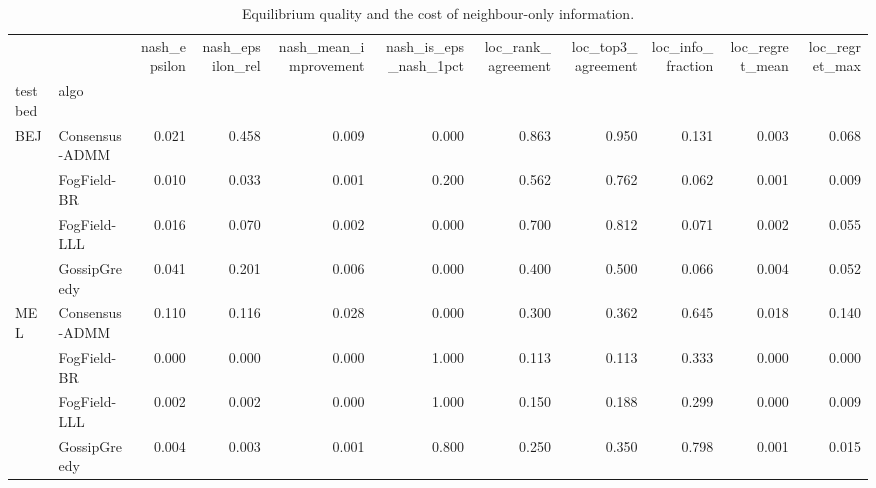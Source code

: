 \begin{table}
\caption{Equilibrium quality and the cost of neighbour-only information.}
\label{tab:table5_equilibrium}
\begin{tabular}{llrrrrrrrrr}
\toprule
 &  & nash\_epsilon & nash\_epsilon\_rel & nash\_mean\_improvement & nash\_is\_eps\_nash\_1pct & loc\_rank\_agreement & loc\_top3\_agreement & loc\_info\_fraction & loc\_regret\_mean & loc\_regret\_max \\
testbed & algo &  &  &  &  &  &  &  &  &  \\
\midrule
\multirow[t]{4}{*}{BEJ} & Consensus-ADMM & 0.021 & 0.458 & 0.009 & 0.000 & 0.863 & 0.950 & 0.131 & 0.003 & 0.068 \\
 & FogField-BR & 0.010 & 0.033 & 0.001 & 0.200 & 0.562 & 0.762 & 0.062 & 0.001 & 0.009 \\
 & FogField-LLL & 0.016 & 0.070 & 0.002 & 0.000 & 0.700 & 0.812 & 0.071 & 0.002 & 0.055 \\
 & GossipGreedy & 0.041 & 0.201 & 0.006 & 0.000 & 0.400 & 0.500 & 0.066 & 0.004 & 0.052 \\
\cline{1-11}
\multirow[t]{4}{*}{MEL} & Consensus-ADMM & 0.110 & 0.116 & 0.028 & 0.000 & 0.300 & 0.362 & 0.645 & 0.018 & 0.140 \\
 & FogField-BR & 0.000 & 0.000 & 0.000 & 1.000 & 0.113 & 0.113 & 0.333 & 0.000 & 0.000 \\
 & FogField-LLL & 0.002 & 0.002 & 0.000 & 1.000 & 0.150 & 0.188 & 0.299 & 0.000 & 0.009 \\
 & GossipGreedy & 0.004 & 0.003 & 0.001 & 0.800 & 0.250 & 0.350 & 0.798 & 0.001 & 0.015 \\
\cline{1-11}
\bottomrule
\end{tabular}
\end{table}
